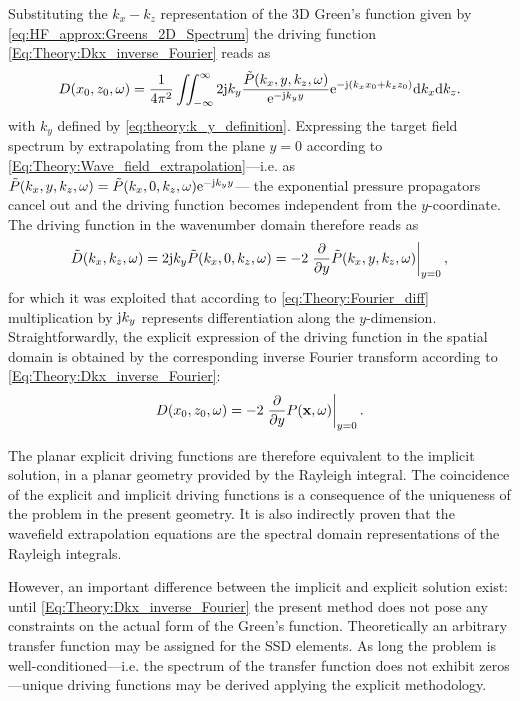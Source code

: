 Substituting the $k_x-k_z$ representation of the 3D Green's function given by \eqref{eq:HF_approx:Greens_2D_Spectrum} the driving function \eqref{Eq:Theory:Dkx_inverse_Fourier} reads as
\begin{equation}
D(x_0,z_0,\omega) = \frac{1}{4\pi^2} \iint_{-\infty}^{\infty} 2\mathrm{j} k_y \frac{\tilde{P}(k_x,y,k_z, \omega)}{ \mathrm{e}^{ -\mathrm{j} k_y  y  } } \mathrm{e}^{-\mathrm{j} (k_x x_0 + k_z z_0)} \mathrm{d} k_x \mathrm{d} k_z.
\end{equation}
with $k_y$ defined by \eqref{eq:theory:k_y_definition}.	
Expressing the target field spectrum by extrapolating from the plane $y = 0$ according to \eqref{Eq:Theory:Wave_field_extrapolation}---i.e. as 
$
\tilde{P}(k_x,y,k_z, \omega) = \tilde{P}(k_x,0,k_z, \omega)  \mathrm{e}^{ -\mathrm{j} k_y  y }
$---
the exponential pressure propagators cancel out and the driving function becomes independent from the $y$-coordinate. 
The driving function in the wavenumber domain therefore reads as
\begin{equation}
\tilde{D}(k_x,k_z,\omega) = 2\mathrm{j} k_y \tilde{P}(k_x,0,k_z,\omega) = -2 \left. \frac{\partial}{\partial y} \tilde{P}(k_x,y,k_z,\omega) \right|_{y = 0},
\label{Eq:Theory:Planar_explicit_driv_fun}
\end{equation}
for which it was exploited that according to \eqref{eq:Theory:Fourier_diff} multiplication by $\mathrm{j} k_y$ represents differentiation along the $y$-dimension.
Straightforwardly, the explicit expression of the driving function in the spatial domain is obtained by the corresponding inverse Fourier transform according to \eqref{Eq:Theory:Dkx_inverse_Fourier}:
\begin{equation}
D(x_0,z_0,\omega) = -2 \left. \frac{\partial}{\partial y} P(\mathbf{x},\omega) \right|_{y = 0}.
\label{Eq:Theory:Planar_explicit_driv_fun_spatial}
\end{equation}

The planar explicit driving functions are therefore equivalent to the implicit solution, in a planar geometry provided by the Rayleigh integral.
The coincidence of the explicit and implicit driving functions is a consequence of the uniqueness of the problem in the present geometry.
It is also indirectly proven that the wavefield extrapolation equations are the spectral domain representations of the Rayleigh integrals.

However, an important difference between the implicit and explicit solution exist: until \eqref{Eq:Theory:Dkx_inverse_Fourier} the present method does not pose any constraints on the actual form of the Green's function. 
Theoretically an arbitrary transfer function may be assigned for the SSD elements. 
As long the problem is well-conditioned---i.e. the spectrum of the transfer function does not exhibit zeros---unique driving functions may be derived applying the explicit methodology.

